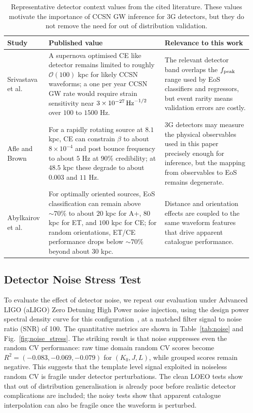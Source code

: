 \documentclass[reprint,aps,prd,floatfix,nofootinbib,superscriptaddress,showpacs]{revtex4-2}
\begin{document}
\begin{table}[t]
    \caption{Representative detector context values from the cited literature. These values motivate the importance of CCSN GW inference for 3G detectors, but they do not remove the need for out of distribution validation.}
\label{tab:detector_context}
\begin{ruledtabular}
\begin{tabular}{p{}p{}p{}}
Study & Published value & Relevance to this work \\
\midrule
Srivastava et al.~\cite{srivastava2019} & A supernova optimised CE like detector remains limited to roughly $\mathcal{O}(100)$ kpc for likely CCSN waveforms; a one per year CCSN GW rate would require strain sensitivity near $3\times 10^{-27}\,{\rm Hz}^{-1/2}$ over $100$ to $1500$ Hz. & The relevant detector band overlaps the $f_{\rm peak}$ range used by EoS classifiers and regressors, but event rarity means validation errors are costly. \\
Afle and Brown~\cite{afle2020} & For a rapidly rotating source at $8.1$ kpc, CE can constrain $\beta$ to about $8\times10^{-4}$ and post bounce frequency to about $5$ Hz at 90\% credibility; at $48.5$ kpc these degrade to about $0.003$ and $11$ Hz. & 3G detectors may measure the physical observables used in this paper precisely enough for inference, but the mapping from observables to EoS remains degenerate. \\
Abylkairov et al.~\cite{abylkairov2025} & For optimally oriented sources, EoS classification can remain above $\sim70\%$ to about $20$ kpc for A+, $80$ kpc for ET, and $100$ kpc for CE; for random orientations, ET/CE performance drops below $\sim70\%$ beyond about $30$ kpc. & Distance and orientation effects are coupled to the same waveform features that drive apparent catalogue performance. \\
\end{tabular}
\end{ruledtabular}
\end{table}

\subsection{Detector Noise Stress Test}
To evaluate the effect of detector noise, we repeat our evaluation under Advanced LIGO (aLIGO) Zero Detuning High Power noise injection, using the design power spectral density curve for this configuration~\cite{ligoT0900288}, at a matched filter signal to noise ratio (SNR) of 100. The quantitative metrics are shown in Table~\ref{tab:noise} and Fig.~\ref{fig:noise_stress}. The striking result is that noise suppresses even the random CV performance: raw time domain random CV scores become $R^2=(-0.083,-0.069,-0.079)$ for $(K_0,J,L)$, while grouped scores remain negative. This suggests that the template level signal exploited in noiseless random CV is fragile under detector perturbations. The clean LOEO tests show that out of distribution generalisation is already poor before realistic detector complications are included; the noisy tests show that apparent catalogue interpolation can also be fragile once the waveform is perturbed.
\end{document}
